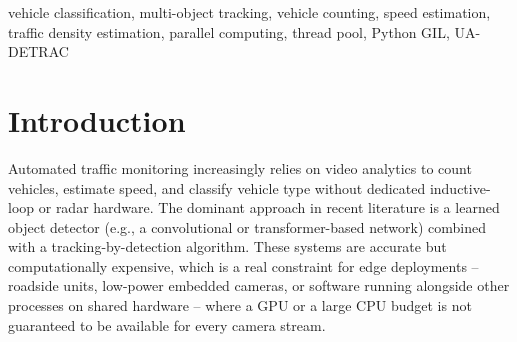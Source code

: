 \documentclass[conference]{IEEEtran}
\newcommand{\code}[1]{\texttt{#1}}
\begin{document}
\begin{abstract}
bit-identical classification results between implementations. On this
corrected basis, the workload-normalized speedup of the parallel
implementation is a modest $1.261\times \pm 0.084$ ($n{=}12$) -- not the
$\sim$3.3$\times$ an uncorrected wall-clock measurement had initially
suggested before an unrelated timing-instrumentation artifact (an
unthrottled \code{cv2.waitKey} poll and an asymmetric per-frame disk
write) was also found and fixed. Per-stage \code{cProfile} analysis
shows this modest speedup is well predicted by an Amdahl's-law estimate
restricted to the fraction of work actually dispatched to the thread
pool ($p{\approx}0.39$, predicting $1.24\times$ at the pool's effective
concurrency width of 2) rather than by the broader fraction of the
pipeline that merely happens to call native code ($p{\approx}0.67$,
predicting $3.0\times$), and that speedup degrades further under
heavier traffic density as the unparallelized, pure-Python
tracking-bookkeeping stage this work adds grows with vehicle count. We
report full accuracy and timing breakdowns by weather category and
density tier, and document both the benchmarking artifacts and the
algorithmic divergences found in the course of this work as evidence
for a general point: an ``identical algorithm, parallelized'' claim
between independently maintained code paths is an empirical claim that
drifts silently and must be re-verified, not assumed from documentation.
\end{abstract}

\begin{IEEEkeywords}
vehicle classification, multi-object tracking, vehicle counting, speed
estimation, traffic density estimation, parallel computing, thread
pool, Python GIL, UA-DETRAC
\end{IEEEkeywords}

\section{Introduction}
\label{sec:intro}

Automated traffic monitoring increasingly relies on video analytics to
count vehicles, estimate speed, and classify vehicle type without
dedicated inductive-loop or radar hardware. The dominant approach in
recent literature is a learned object detector (e.g., a convolutional or
transformer-based network) combined with a tracking-by-detection
algorithm. These systems are accurate but computationally expensive,
which is a real constraint for edge deployments -- roadside units,
low-power embedded cameras, or software running alongside other
processes on shared hardware -- where a GPU or a large CPU budget is not
guaranteed to be available for every camera stream.
\end{document}
